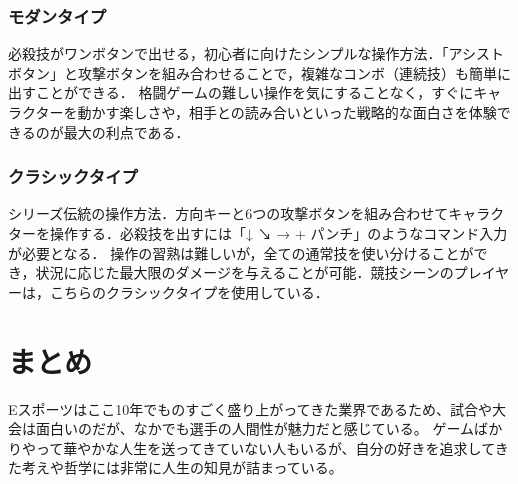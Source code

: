 \documentclass[twocolumn, a4paper]{Zemiresume}
\begin{document}
\subsubsection{モダンタイプ}
必殺技がワンボタンで出せる，初心者に向けたシンプルな操作方法．「アシストボタン」と攻撃ボタンを組み合わせることで，複雑なコンボ（連続技）も簡単に出すことができる．
格闘ゲームの難しい操作を気にすることなく，すぐにキャラクターを動かす楽しさや，相手との読み合いといった戦略的な面白さを体験できるのが最大の利点である．

\subsubsection{クラシックタイプ}
シリーズ伝統の操作方法．方向キーと6つの攻撃ボタンを組み合わせてキャラクターを操作する．必殺技を出すには「↓ ↘ → + パンチ」のようなコマンド入力が必要となる．
操作の習熟は難しいが，全ての通常技を使い分けることができ，状況に応じた最大限のダメージを与えることが可能．競技シーンのプレイヤーは，こちらのクラシックタイプを使用している．

\section{まとめ}
Eスポーツはここ10年でものすごく盛り上がってきた業界であるため、試合や大会は面白いのだが、なかでも選手の人間性が魅力だと感じている。
ゲームばかりやって華やかな人生を送ってきていない人もいるが、自分の好きを追求してきた考えや哲学には非常に人生の知見が詰まっている。

{\small


}
\end{document}
